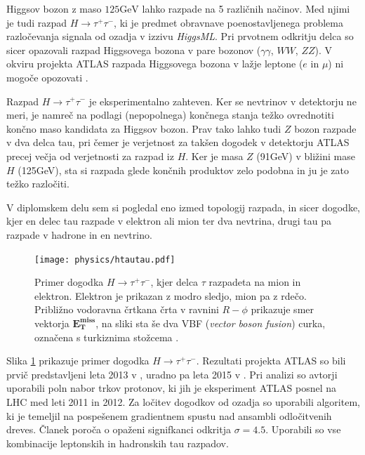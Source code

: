 \documentclass[11pt,a4paper,openany]{book}
\begin{document}
Higgsov bozon z maso $125\text{GeV}$ lahko razpade na 5 različnih načinov. Med njimi je tudi razpad $H \rightarrow \tau^+\tau^-$, ki je predmet obravnave poenostavljenega problema razločevanja signala od ozadja v izzivu \textit{HiggsML}. Pri prvotnem odkritju delca so sicer opazovali razpad Higgsovega bozona v pare bozonov ($\gamma\gamma$, $WW$, $ZZ$). V okviru projekta ATLAS razpada Higgsovega bozona v lažje leptone ($e$ in $\mu$) ni mogoče opozovati \cite{ChallengeDoc}.

Razpad $H \rightarrow \tau^+\tau^-$ je eksperimentalno zahteven. Ker se nevtrinov v detektorju ne meri, je namreč na podlagi (nepopolnega) končnega stanja težko ovrednotiti končno maso kandidata za Higgsov bozon. Prav tako lahko tudi $Z$ bozon razpade v dva delca tau, pri čemer je verjetnost za takšen dogodek v detektorju ATLAS precej večja od verjetnosti za razpad iz $H$. Ker je masa $Z$ (91GeV) v bližini mase $H$ (125GeV), sta si razpada glede končnih produktov zelo podobna in ju je zato težko razločiti.

V diplomskem delu sem si pogledal eno izmed topologij razpada, in sicer dogodke, kjer en delec tau razpade v elektron ali mion ter dva nevtrina, drugi tau pa razpade v hadrone in en nevtrino.

\begin{figure}[ht]
	\texttt{[image: physics/htautau.pdf]}
	
	\caption{Primer dogodka $H \rightarrow \tau^+\tau^-$, kjer delca $\tau$ razpadeta na mion in elektron. Elektron je prikazan z modro sledjo, mion pa z rdečo. Približno vodoravna črtkana črta v ravnini $R-\phi$ prikazuje smer vektorja $\mathbf{E_T^{miss}}$, na sliki sta še dva VBF (\textit{vector boson fusion}) curka, označena s turkiznima stožcema \cite{atlas2015htautau}.  }
	\label{htautau}
\end{figure}

Slika \ref{htautau} prikazuje primer dogodka $H \rightarrow \tau^+\tau^-$. Rezultati projekta ATLAS so bili prvič predstavljeni leta 2013 v \cite{atlas2013}, uradno pa leta 2015 v \cite{atlas2015htautau}. Pri analizi so avtorji uporabili poln nabor trkov protonov, ki jih je eksperiment ATLAS posnel na LHC med leti 2011 in 2012. Za ločitev dogodkov od ozadja so uporabili algoritem, ki je temeljil na pospešenem gradientnem spustu nad ansambli odločitvenih dreves. Članek poroča o opaženi signifkanci odkritja $\sigma = 4.5$. Uporabili so vse kombinacije leptonskih in hadronskih tau razpadov.
\end{document}
